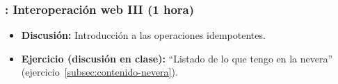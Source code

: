 \documentclass[a4paper,12pt]{article}
\begin{document}
\subsubsection{\martesI: Interoperación web III (1 hora)}
\label{cal:martesI}

\begin{itemize}
\item \textbf{Discusión:} Introducción a las operaciones idempotentes.
\item \textbf{Ejercicio (discusión en clase):} ``Listado de lo que tengo en la nevera'' (ejercicio~\ref{subsec:contenido-nevera}). 
\end{itemize}




\end{document}
